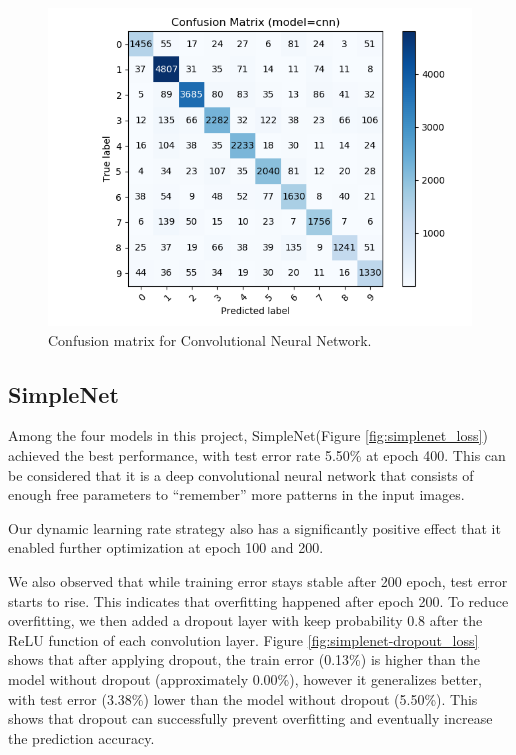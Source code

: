 \documentclass[journal]{IEEEtran}
\begin{document}
\begin{figure}[htb]
\includegraphics[width=\linewidth]{images/cnn-cm.png}
\caption{Confusion matrix for Convolutional Neural Network.}\label{fig:cnn_cm}
\end{figure}

\subsection{SimpleNet}\label{section:simplenet}

Among the four models in this project, SimpleNet(Figure \ref{fig:simplenet_loss}) achieved the best performance, with test error rate 5.50\% at epoch 400. This can be considered that it is a deep convolutional neural network that consists of enough free parameters to ``remember'' more patterns in the input images.

Our dynamic learning rate strategy also has a significantly positive effect that it enabled further optimization at epoch 100 and 200.

We also observed that while training error stays stable after 200 epoch, test error starts to rise. This indicates that overfitting happened after epoch 200. To reduce overfitting, we then added a dropout layer with keep probability 0.8 after the ReLU function of each convolution layer. Figure \ref{fig:simplenet-dropout_loss} shows that after applying dropout, the train error (0.13\%) is higher than the model without dropout (approximately 0.00\%), however it generalizes better, with test error (3.38\%) lower than the model without dropout (5.50\%). This shows that dropout can successfully prevent overfitting and eventually increase the prediction accuracy.
\end{document}
